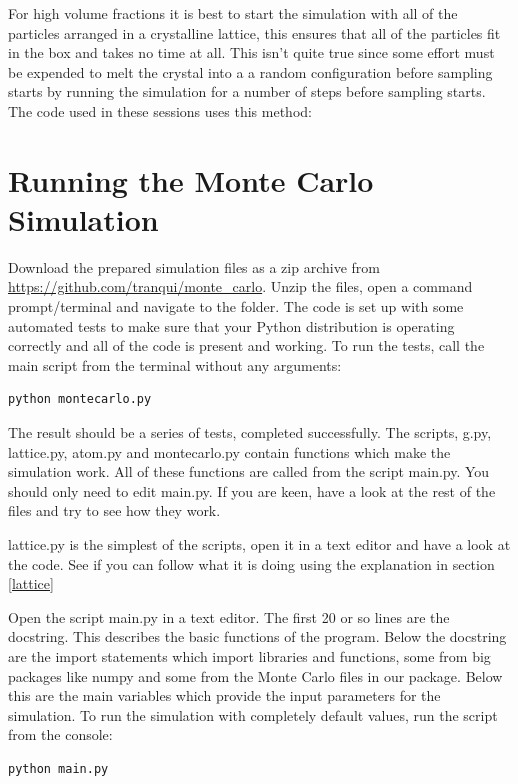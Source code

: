 		For high volume fractions it is best to start the simulation with all of the particles arranged in a crystalline lattice, this ensures that all of the particles fit in the box and takes no time at all. This isn't quite true since some effort must be expended to melt the crystal into a a random configuration before sampling starts by running the simulation for a number of steps before sampling starts. The code used in these sessions uses this method:


\section{Running the Monte Carlo Simulation}
	Download the prepared simulation files as a zip archive from \url{https://github.com/tranqui/monte_carlo}. Unzip the files, open a command prompt/terminal and navigate to the folder. The code is set up with some automated tests to make sure that your Python distribution is operating correctly and all of the code is present and working. To run the tests, call the main script from the terminal without any arguments:
	\begin{lstlisting}	
python montecarlo.py\end{lstlisting}
	The result should be a series of tests, completed successfully.
	The scripts, g.py, lattice.py, atom.py and montecarlo.py contain functions which make the simulation work. All of these functions are called from the script main.py. You should only need to edit main.py. If you are keen, have a look at the rest of the files and try to see how they work.
	
	\begin{task}lattice.py is the simplest of the scripts, open it in a text editor and have a look at the code. See if you can follow what it is doing using the explanation in section \ref{lattice}\end{task}

	Open the script main.py in a text editor. The first 20 or so lines are the docstring. This describes the basic functions of the program. Below the docstring are the import statements which import libraries and functions, some from big packages like numpy and some from the Monte Carlo files in our package. Below this are the main variables which provide the input parameters for the simulation.  To run the simulation with completely default values, run the script from the console:
\begin{lstlisting}	
python main.py\end{lstlisting}

